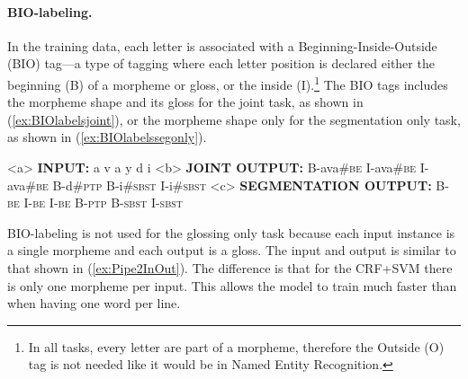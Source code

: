 \paragraph{BIO-labeling.} 
In the training data, each letter is associated with a Beginning-Inside-Outside (BIO) tag---a type of tagging where each letter position is declared either the beginning (B) of a morpheme or gloss, or the inside (I).\footnote{In all tasks, every letter are part of a morpheme, therefore the Outside (O) tag is not needed like it would be in Named Entity Recognition.} The BIO tags includes the morpheme shape and its gloss for the joint task, as shown in (\ref{ex:BIOlabelsjoint}), or the morpheme shape only for the segmentation only task, as shown in (\ref{ex:BIOlabelssegonly}). 

\pex   
\label{ex:BIOlabels}
\a<a> {\bf INPUT:} \hspace{5 mm}  a \hspace{10 mm}  v \hspace{10 mm} a \hspace{10 mm} y \hspace{10 mm} d \hspace{10 mm} i
\a<b> {\bf JOINT OUTPUT:} \hspace{.5 mm} B-ava\#\textsc{be} \hspace{.5 mm} I-ava\#\textsc{be}  \hspace{.5 mm} I-ava\#\textsc{be} \hspace{1 mm} B-d\#\textsc{ptp}  \hspace{.5 mm}B-i\#\textsc{sbst}  \hspace{.5 mm} I-i\#\textsc{sbst}
\label{ex:BIOlabelsjoint}
\a<c> {\bf SEGMENTATION OUTPUT:} \hspace{1 mm} B-\textsc{be} \hspace{1 mm} I-\textsc{be} \hspace{1 mm} I-\textsc{be} \hspace{1 mm} B-\textsc{ptp} \hspace{1 mm} B-\textsc{sbst} \hspace{1 mm} I-\textsc{sbst}
\label{ex:BIOlabelssegonly}
\xe

BIO-labeling is not used for the glossing only task because each input instance is a single morpheme and each output is a gloss. The input and output is similar to that shown in (\ref{ex:Pipe2InOut}). The difference is that for the CRF+SVM there is only one morpheme per input. This allows the model to train much faster than when having one word per line.

